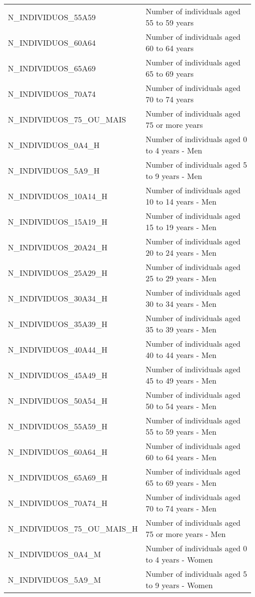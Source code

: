 \begin{xltabular}{\textwidth}{|p{0.4\textwidth}|p{0.6\textwidth}|}
  N\_INDIVIDUOS\_55A59 & Number of individuals aged 55 to 59 years \\
  N\_INDIVIDUOS\_60A64 & Number of individuals aged 60 to 64 years \\
  N\_INDIVIDUOS\_65A69 & Number of individuals aged 65 to 69 years \\
  N\_INDIVIDUOS\_70A74 & Number of individuals aged 70 to 74 years \\
  N\_INDIVIDUOS\_75\_OU\_MAIS & Number of individuals aged 75 or more years \\
  N\_INDIVIDUOS\_0A4\_H & Number of individuals aged 0 to 4 years - Men \\
  N\_INDIVIDUOS\_5A9\_H & Number of individuals aged 5 to 9 years - Men \\
  N\_INDIVIDUOS\_10A14\_H & Number of individuals aged 10 to 14 years - Men \\
  N\_INDIVIDUOS\_15A19\_H & Number of individuals aged 15 to 19 years - Men \\
  N\_INDIVIDUOS\_20A24\_H & Number of individuals aged 20 to 24 years - Men \\
  N\_INDIVIDUOS\_25A29\_H & Number of individuals aged 25 to 29 years - Men \\
  N\_INDIVIDUOS\_30A34\_H & Number of individuals aged 30 to 34 years - Men \\
  N\_INDIVIDUOS\_35A39\_H & Number of individuals aged 35 to 39 years - Men \\
  N\_INDIVIDUOS\_40A44\_H & Number of individuals aged 40 to 44 years - Men \\
  N\_INDIVIDUOS\_45A49\_H & Number of individuals aged 45 to 49 years - Men \\
  N\_INDIVIDUOS\_50A54\_H & Number of individuals aged 50 to 54 years - Men \\
  N\_INDIVIDUOS\_55A59\_H & Number of individuals aged 55 to 59 years - Men \\
  N\_INDIVIDUOS\_60A64\_H & Number of individuals aged 60 to 64 years - Men \\
  N\_INDIVIDUOS\_65A69\_H & Number of individuals aged 65 to 69 years - Men \\
  N\_INDIVIDUOS\_70A74\_H & Number of individuals aged 70 to 74 years - Men \\
  N\_INDIVIDUOS\_75\_OU\_MAIS\_H & Number of individuals aged 75 or more years - Men \\
  N\_INDIVIDUOS\_0A4\_M & Number of individuals aged 0 to 4 years - Women \\
  N\_INDIVIDUOS\_5A9\_M & Number of individuals aged 5 to 9 years - Women \\

\end{xltabular}
